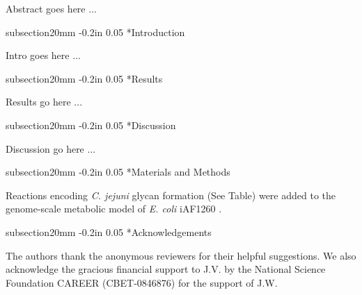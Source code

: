 \documentclass[12pt]{article}
\makeatletter
\renewcommand\section{\@startsection
	{subsection}{2}{0mm}
	{-0.2in}
	{0.05\baselineskip}
	{\normalfont\large\bfseries}}
\makeatother
\begin{document}
Abstract goes here ...

\newpage
\setcounter{page}{1}
\linenumbers
\section*{Introduction}

Intro goes here ... 

\newpage
\section*{Results}

Results go here ...

\newpage
\section*{Discussion}

Discussion go here ...

\newpage
\section*{Materials and Methods}

Reactions encoding \textit{C. jejuni} glycan formation (See Table) were added to the genome-scale metabolic model of \textit{E. coli} iAF1260 \cite{2007_feist_reed_hatzimanikatis_palsson_MolSysBio}.

\newpage
\section*{Acknowledgements}

The authors thank the anonymous reviewers for their helpful suggestions. 
We also acknowledge the gracious financial support to J.V. by the National Science Foundation CAREER (CBET-0846876) for the support of J.W.
\end{document}
